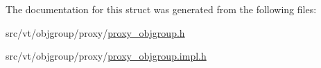 The documentation for this struct was generated from the following files\+:\begin{DoxyCompactItemize}
\item 
src/vt/objgroup/proxy/\hyperlink{proxy__objgroup_8h}{proxy\+\_\+objgroup.\+h}\item 
src/vt/objgroup/proxy/\hyperlink{proxy__objgroup_8impl_8h}{proxy\+\_\+objgroup.\+impl.\+h}\end{DoxyCompactItemize}
